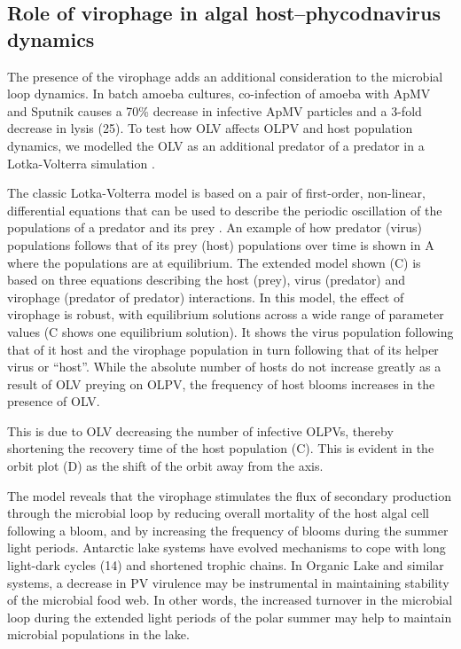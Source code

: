 \subsection[Virophage in algal host--phycodnavirus dynamics]{Role of virophage in algal host--phycodnavirus dynamics}
The presence of the virophage adds an additional consideration to the microbial loop dynamics. 
In batch amoeba cultures, co-infection of amoeba with \ac{ApMV} and Sputnik causes a 70\% decrease in infective \ac{ApMV} particles and a 3-fold decrease in lysis (25). 
To test how \ac{OLV} affects \ac{OLPV} and host population dynamics, we modelled the \ac{OLV} as an additional predator of a predator in a Lotka-Volterra simulation .
 
The classic Lotka-Volterra model \cite{Lotka1910} is based on a pair of first-order, non-linear, differential equations that can be used to describe the periodic oscillation of the populations of a predator and its prey \cite{Volterra1926}. 
An example of how predator (virus) populations follows that of its prey (host) populations over time is shown in A where the populations are at equilibrium.
The extended model shown (C) is based on three equations describing the host (prey), virus (predator) and virophage (predator of predator) interactions. 
In this model, the effect of virophage is robust, with equilibrium solutions across a wide range of parameter values (C shows one equilibrium solution).
It shows the virus population following that of it host and the virophage population in turn following that of its helper virus or ``host''. While the absolute number of hosts do not increase greatly as a result of \ac{OLV} preying on \ac{OLPV}, the frequency of host blooms increases in the presence of \ac{OLV}. 

This is due to \ac{OLV} decreasing the number of infective \acp{OLPV}, thereby shortening the recovery time of the host population (C).
This is evident in the orbit plot (D) as the shift of the orbit away from the axis. 

The model reveals that the virophage stimulates the flux of secondary production through the microbial loop by reducing overall mortality of the host algal cell following a bloom, and by increasing the frequency of blooms during the summer light periods. 
Antarctic lake systems have evolved mechanisms to cope with long light-dark cycles (14) and shortened trophic chains. 
In Organic Lake and similar systems, a decrease in \ac{PV} virulence may be instrumental in maintaining stability of the microbial food web. 
In other words, the increased turnover in the microbial loop during the extended light periods of the polar summer may help to maintain microbial populations in the lake.

